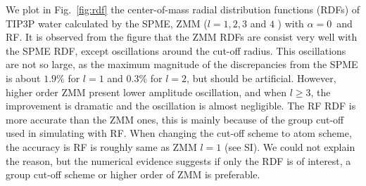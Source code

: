 \documentclass[a4paper,preprint,unsortedaddress,onecolumn,fleqn]{revtex4}
\newcommand{\recheck}[1]{{\color{red} #1}}
\begin{document}
We plot in Fig.~\ref{fig:rdf} the center-of-mass radial distribution
functions (RDFs) of TIP3P water calculated by the SPME, ZMM ($l=1,2,3$ and $4$%
) with $\alpha =0$\ and RF. It is observed from the figure that the
ZMM RDFs are consist very well with the SPME RDF, except oscillations around
the cut-off radius. This oscillations are not so large, as the maximum
magnitude of the discrepancies from the SPME is about $1.9\%$ for $l=1$ and $%
{0.3\%}$ for $l=2$, %
but should be artificial. However, higher order ZMM present lower
amplitude oscillation, and when $l\geq 3$, the improvement is dramatic and
the oscillation is almost negligible. \recheck{The RF RDF is more accurate than the ZMM ones,
this is mainly because of the group cut-off used in simulating with RF. When changing
the cut-off scheme to atom scheme, the accuracy is RF is roughly same as ZMM $l=1$ (see SI).
We could not explain the reason, but the numerical evidence suggests if only the RDF is
of interest, a group cut-off scheme or higher order of ZMM is preferable.
}


\end{document}
